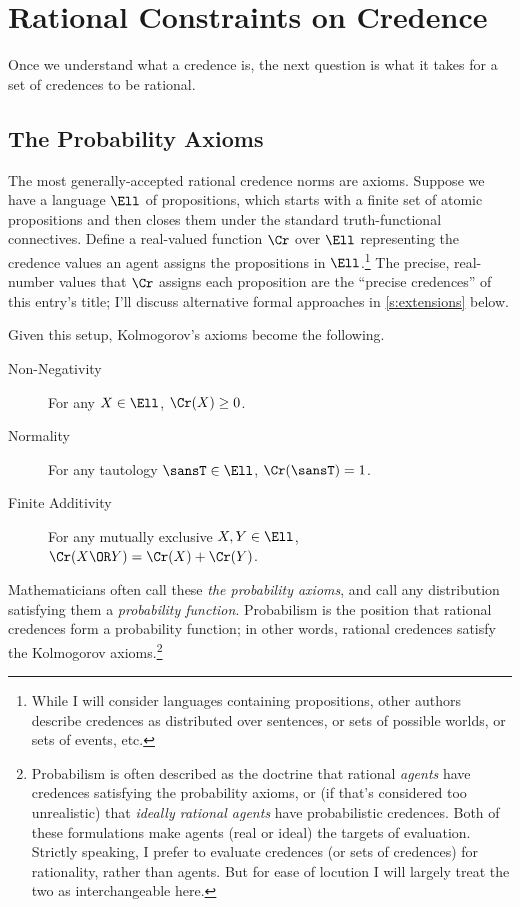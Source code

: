 \section{Rational Constraints on Credence}\label{s:constraints}

Once we understand what a credence is, the next question is what it takes for a set of credences to be rational.

\subsection{The Probability Axioms}\label{ss:Kolm}

The most generally-accepted rational credence norms are  axioms. Suppose we have a language $\Ell$ of propositions, which starts with a finite set of atomic propositions and then closes them under the standard truth-functional connectives. Define a real-valued function $\Cr$ over $\Ell$ representing the credence values an agent assigns the propositions in $\Ell$.\footnote
{While I will consider languages containing propositions, other authors describe credences as distributed over sentences, or sets of possible worlds, or sets of events, etc.} 
 The precise, real-number values that $\Cr$ assigns each proposition are the ``precise credences'' of this entry's title; I'll discuss alternative formal approaches in \autoref{s:extensions}  below.

Given this setup, Kolmogorov's axioms become the following.
\begin{description}
\item[Non-Negativity] {For any $X \in \Ell$, $\Cr(X) \ge 0$.}
\item[Normality] {For any tautology $\sansT \in \Ell$, $\Cr(\sansT)=1$.}
\item[Finite Additivity] {For any mutually exclusive $X, Y \in \Ell$,\\ $\Cr(X \OR Y)=\Cr(X)+\Cr(Y)$.}  
\end{description}  
Mathematicians often call these \textit{the probability axioms}, and call any distribution satisfying them a \textit{probability function}. Probabilism is the position that rational credences form a probability function; in other words, rational credences satisfy the Kolmogorov axioms.\footnote
{Probabilism is often described as the doctrine that rational \emph{agents} have credences satisfying the probability axioms, or (if that's considered too unrealistic) that \emph{ideally rational agents} have probabilistic credences. Both of these formulations make agents (real or ideal) the targets of evaluation. Strictly speaking, I prefer to evaluate credences (or sets of credences) for rationality, rather than agents. But for ease of locution I will largely treat the two as interchangeable here.} 

